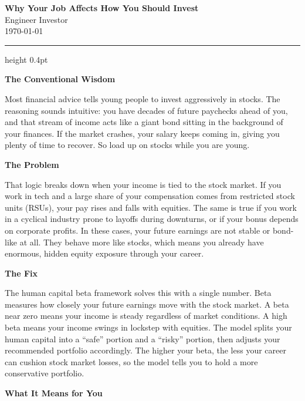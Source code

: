 \documentclass[12pt]{article}
\begin{document}
\begin{center}
  {\LARGE\bfseries\color{accent} Why Your Job Affects How You Should Invest}\\[0.6em]
  {\large Engineer Investor}\\[0.3em]
  {\small\color{gray} \today}
\end{center}

\vspace{0.8em}
\hrule height 0.4pt
\vspace{1.0em}

{\large\bfseries\color{accent} The Conventional Wisdom}

Most financial advice tells young people to invest aggressively in stocks.
The reasoning sounds intuitive: you have decades of future paychecks ahead of you,
and that stream of income acts like a giant bond sitting in the background of your
finances. If the market crashes, your salary keeps coming in, giving you plenty of
time to recover. So load up on stocks while you are young.

{\large\bfseries\color{accent} The Problem}

That logic breaks down when your income is tied to the stock market. If you work in
tech and a large share of your compensation comes from restricted stock units (RSUs),
your pay rises and falls with equities. The same is true if you work in a cyclical
industry prone to layoffs during downturns, or if your bonus depends on corporate
profits. In these cases, your future earnings are not stable or bond-like at all.
They behave more like stocks, which means you already have enormous, hidden equity
exposure through your career.

{\large\bfseries\color{accent} The Fix}

The human capital beta framework solves this with a single number. Beta measures how
closely your future earnings move with the stock market. A beta near zero means your
income is steady regardless of market conditions. A high beta means your income swings
in lockstep with equities. The model splits your human capital into a ``safe'' portion
and a ``risky'' portion, then adjusts your recommended portfolio accordingly. The
higher your beta, the less your career can cushion stock market losses, so the model
tells you to hold a more conservative portfolio.

{\large\bfseries\color{accent} What It Means for You}
\end{document}
